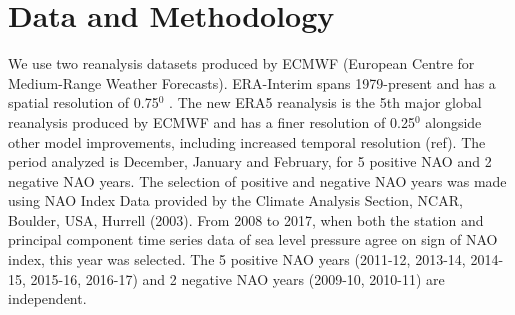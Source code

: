 




\section{Data and Methodology}

We use two reanalysis datasets produced by ECMWF (European Centre for Medium-Range Weather Forecasts). ERA-Interim spans 1979-present and has a spatial resolution of 0.75$^{0}$ \citep{dee2011era}. The new ERA5 reanalysis is the 5th major global reanalysis produced by ECMWF and has a finer resolution of 0.25$^{0}$ alongside other model improvements, including increased temporal resolution (ref). The period analyzed is December, January and February, for 5 positive NAO and 2 negative NAO years. The selection of positive and negative NAO years was made using NAO Index Data provided by the Climate Analysis Section, NCAR, Boulder, USA, Hurrell (2003). From 2008 to 2017, when both the station and principal component time series data of sea level pressure agree on sign of NAO index, this year was selected. The 5 positive NAO years (2011-12, 2013-14, 2014-15, 2015-16, 2016-17) and 2 negative NAO years (2009-10, 2010-11) are independent.

